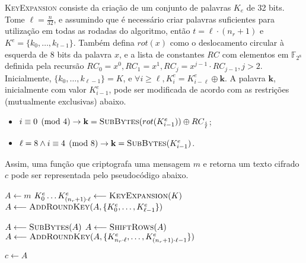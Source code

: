 \documentclass[12pt]{report}
\begin{document}
\textsc{KeyExpansion} consiste da criação de um conjunto de palavras $K_e$ de 32 bits.
Tome $\ell = \frac{n}{32}$, e assumindo que é necessário criar palavras suficientes para utilização em todas as rodadas do algoritmo, então $t = \ell \cdot (n_r + 1)$ e $K^e = \{k_0, \dots, k_{t - 1}\}$. Também defina $rot(x)$ como o deslocamento circular à esquerda de 8 bits da palavra $x$, e a lista de constantes $RC$ com elementos em $\mathbb{F}_{2^{8}}$ definida pela recursão $RC_0 = x^0, RC_1 = x^1, RC_j = x^{j-1} \cdot RC_{j-1}, j > 2$. Inicialmente, $\{k_0, \dots, k_{\ell - 1}\} = K$, e $\forall i \geq \ell, K^{e}_{i} = K^{e}_{i - \ell} \oplus \mathbf{k}$. A palavra $\mathbf{k}$, inicialmente com valor $K^{e}_{i - 1}$, pode ser modificada de acordo com as restrições (mutualmente exclusivas) abaixo.

\begin{itemize}
    \item $i \equiv 0 \pmod{4} \rightarrow \mathbf{k}
        = \textsc{SubBytes}(rot(K^{e}_{i - 1})) \oplus RC_{\frac{i}{\ell}}$;
    \item $\ell = 8 \land i \equiv 4 \pmod{8} \rightarrow \mathbf{k}
        = \textsc{SubBytes}(K^{e}_{i - 1})$.
\end{itemize}

Assim, uma função que criptografa uma mensagem $m$ e retorna um texto cifrado $c$ pode ser
representada pelo pseudocódigo abaixo.

\begin{algorithm}[H]
    \small

    $A \longleftarrow m$\;
    $K^{e}_{0} \dots K^{e}_{(n_r + 1) \cdot \ell}
        \longleftarrow \textsc{KeyExpansion}(K)$\;
    $A \longleftarrow \textsc{AddRoundKey}(A,
        \{K^{e}_{0}, \dots, K^{e}_{\ell - 1}\})$\;
    
 
    $A \longleftarrow \textsc{SubBytes}(A)$\;
    $A \longleftarrow \textsc{ShiftRows}(A)$\;
    $A \longleftarrow \textsc{AddRoundKey}(A,
        \{K^{e}_{n_r \cdot \ell}, \dots, K^{e}_{(n_r + 1) \cdot \ell - 1}\})$\;

    $c \longleftarrow A$\;
\end{algorithm}
\end{document}
